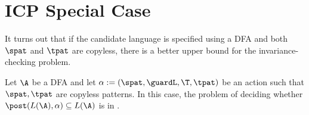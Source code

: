 
\section{ICP Special Case}\label{sec:icpSpecialCase}

It turns out that if the candidate language is specified using a DFA and both $\spat$ and $\tpat$ are copyless, there is a better upper bound
for the invariance-checking problem.

\begin{theorem}
	Let $\A$ be a DFA and let $\alpha := (\spat, \guardL, \T, \tpat)$ be an action such that $\spat, \tpat$ are copyless patterns. In this case, the problem of deciding whether $\post(L(\A), \alpha) \subseteq L(\A)$ is in \conp.
\end{theorem}

